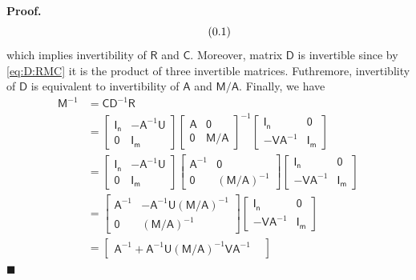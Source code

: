 \documentclass[10pt]{article}
\theoremstyle{definition}
\newenvironment{prf}{\noindent\textbf{Proof.}}{\hfill$\blacksquare$}
\newcommand\eqnum{\addtocounter{equation}{1}\tag{\arabic{section}.\arabic{equation}}}
\begin{document}
\begin{prf}
\begin{equation}
\eqnum
\label{eq:det:RC}
\end{equation}
which implies invertibility of $\mathsf{R}$ and $\mathsf{C}$. Moreover, matrix $\mathsf{D}$ is invertible since by \cref{eq:D:RMC} it is the product of three invertible matrices. Futhremore, invertiblity of $\mathsf{D}$ is equivalent to invertibility of $\mathsf{A}$ and $\mathsf{M}/\mathsf{A}$. Finally, we have
\begin{align*}
\mathsf{M}^{-1} &= \mathsf{C}\mathsf{D}^{-1}\mathsf{R} \\
&= 
\begin{bmatrix}
\mathsf{I_n} & -\mathsf{A}^{-1}\mathsf{U} \\
\mathsf{0} & \mathsf{I_m}
\end{bmatrix}
\begin{bmatrix}
\mathsf{A} & \mathsf{0} \\
\mathsf{0} & \mathsf{M}/\mathsf{A}
\end{bmatrix}^{-1}
\begin{bmatrix}
\mathsf{I_n} & \mathsf{0} \\
-\mathsf{V}\mathsf{A}^{-1} & \mathsf{I_m}
\end{bmatrix} \\ &=
\begin{bmatrix}
\mathsf{I_n} & -\mathsf{A}^{-1}\mathsf{U} \\
\mathsf{0} & \mathsf{I_m}
\end{bmatrix}
\begin{bmatrix}
\mathsf{A}^{-1} & \mathsf{0} \\
\mathsf{0} & (\mathsf{M}/\mathsf{A})^{-1}
\end{bmatrix}
\begin{bmatrix}
\mathsf{I_n} & \mathsf{0} \\
-\mathsf{V}\mathsf{A}^{-1} & \mathsf{I_m}
\end{bmatrix} \\ &=
\begin{bmatrix}
\mathsf{A}^{-1} & -\mathsf{A}^{-1}\mathsf{U}(\mathsf{M}/\mathsf{A})^{-1} \\
\mathsf{0} & (\mathsf{M}/\mathsf{A})^{-1}
\end{bmatrix}
\begin{bmatrix}
\mathsf{I_n} & \mathsf{0} \\
-\mathsf{V}\mathsf{A}^{-1} & \mathsf{I_m}
\end{bmatrix} \\ &=
\begin{bmatrix}
\mathsf{A}^{-1} + \mathsf{A}^{-1}\mathsf{U}(\mathsf{M}/\mathsf{A})^{-1}\mathsf{V}\mathsf{A}^{-1} & 

\end{bmatrix}
\end{align*}
\end{prf}
\end{document}
